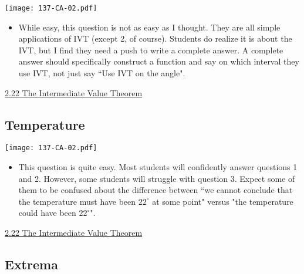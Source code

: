 \documentclass[11pt]{article}
\newcommand{\n}{\newpage}
\newcommand{\nl}{\hfill \vspace{-1.1\baselineskip}} %
\newcommand{\vxxii}{\hspace{8mm} \href{https://www.youtube.com/watch?v=ncR9x7p6LaU&list=PLlwePzQY_wW8P_I8BFgm0-upywEwTKd8_&index=22}{2.22 The Intermediate Value Theorem}}
\begin{document}
\begin{center}
{ \texttt{[image: 137-CA-02.pdf]}}
\end{center}

\begin{comments}
\nl
	\begin{itemize}
		\item  While easy, this question is not as easy as I thought.  They are all simple applications of IVT (except 2, of course).    Students do realize it is about the IVT, but I find they need a push to write a complete answer.  A complete answer should specifically construct a function and say on which interval  they use IVT, not just say ``Use IVT on the angle". 
	\end{itemize}
\end{comments}

\begin{videos}
\vxxii
\end{videos}

\n

\subsection{Temperature}
\begin{center}
{ \texttt{[image: 137-CA-02.pdf]}}
\end{center}

\begin{comments}
\nl
\begin{itemize}
\item This question is quite easy. Most students will confidently answer questions 1 and 2. However, some students will struggle with question 3. Expect some of them to be confused about the difference between ``we cannot conclude that the temperature must have been $22^\circ$ at some point" versus "the temperature could have been $22^\circ$".
\end{itemize}

\end{comments}

\begin{videos}
\vxxii
\end{videos}

\n
\subsection{Extrema} 
\end{document}

